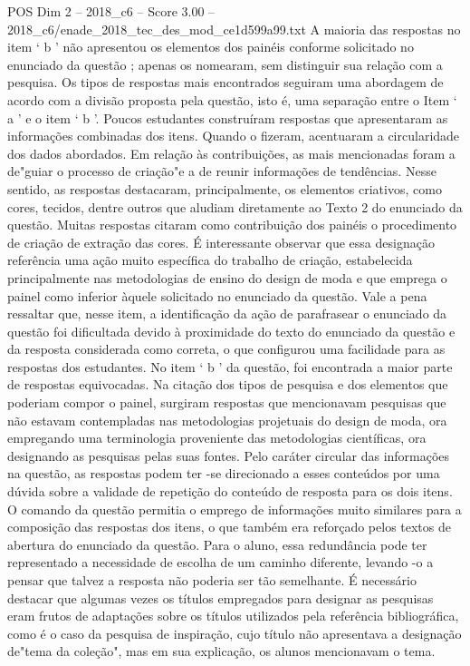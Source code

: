 \begin{textsample}{POS Dim 2 – 2018\_c6 – Score 3.00 – 2018\_c6/enade\_2018\_tec\_des\_mod\_ce1d599a99.txt}
A maioria das respostas no item ‘ b ’ não apresentou os elementos dos painéis conforme solicitado no enunciado da questão ; apenas os nomearam, sem distinguir sua relação com a pesquisa.
Os tipos de respostas mais encontrados seguiram uma abordagem de acordo com a divisão proposta pela questão, isto é, uma separação entre o Item ‘ a ’ e o item ‘ b ’.
Poucos estudantes construíram respostas que apresentaram as informações combinadas dos itens.
Quando o fizeram, acentuaram a circularidade dos dados abordados.
Em relação às contribuições, as mais mencionadas foram a de"guiar o processo de criação"e a de reunir informações de tendências.
Nesse sentido, as respostas destacaram, principalmente, os elementos criativos, como cores, tecidos, dentre outros que aludiam diretamente ao Texto 2 do enunciado da questão.
Muitas respostas citaram como contribuição dos painéis o procedimento de criação de extração das cores.
É interessante observar que essa designação referência uma ação muito específica do trabalho de criação, estabelecida principalmente nas metodologias de ensino do design de moda e que emprega o painel como inferior àquele solicitado no enunciado da questão.
Vale a pena ressaltar que, nesse item, a identificação da ação de parafrasear o enunciado da questão foi dificultada devido à proximidade do texto do enunciado da questão e da resposta considerada como correta, o que configurou uma facilidade para as respostas dos estudantes.
No item ‘ b ’ da questão, foi encontrada a maior parte de respostas equivocadas.
Na citação dos tipos de pesquisa e dos elementos que poderiam compor o painel, surgiram respostas que mencionavam pesquisas que não estavam contempladas nas metodologias projetuais do design de moda, ora empregando uma terminologia proveniente das metodologias científicas, ora designando as pesquisas pelas suas fontes.
Pelo caráter circular das informações na questão, as respostas podem ter -se direcionado a esses conteúdos por uma dúvida sobre a validade de repetição do conteúdo de resposta para os dois itens.
O comando da questão permitia o emprego de informações muito similares para a composição das respostas dos itens, o que também era reforçado pelos textos de abertura do enunciado da questão.
Para o aluno, essa redundância pode ter representado a necessidade de escolha de um caminho diferente, levando -o a pensar que talvez a resposta não poderia ser tão semelhante.
É necessário destacar que algumas vezes os títulos empregados para designar as pesquisas eram frutos de adaptações sobre os títulos utilizados pela referência bibliográfica, como é o caso da pesquisa de inspiração, cujo título não apresentava a designação de"tema da coleção", mas em sua explicação, os alunos mencionavam o tema.

\end{textsample}
